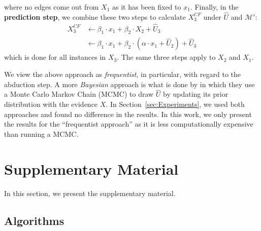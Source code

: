 \noindent
where no edges come out from $X_1$ as it has been fixed to $x_1$. 
Finally, in the \textbf{prediction step}, we combine these two steps to calculate $X_3^{CF}$ under $\hat{U}$ and $\mathcal{M}'$:
%
\begin{align*}
    X_3^{CF} & \leftarrow \beta_1 \cdot x_1 + \beta_2 \cdot X_2 + \hat{U}_3 \\
             & \leftarrow \beta_1 \cdot x_1 + \beta_2 \cdot (\alpha \cdot x_1 + \hat{U}_2) + \hat{U}_3
\end{align*}
%
which is done for all instances in $X_3$. 
The same three steps apply to $X_2$ and $X_1$.

We view the above approach as \textit{frequentist}, in particular, with regard to the abduction step.
A more \textit{Bayesian} approach is what is done by \textcite{Kusner2017CF} in which they use a Monte Carlo Markov Chain (MCMC) to draw $\hat{U}$ by updating its prior distribution with the evidence $X$. 
In Section~\ref{sec:Experiments}, we used both approaches and found no difference in the results. 
In this work, we only present the results for the ``frequentist approach'' as it is less computationally expensive than running a MCMC. 

\section{Supplementary Material}
\label{Appendix.Supplements}

In this section, we present the supplementary material.

\subsection{Algorithms}

